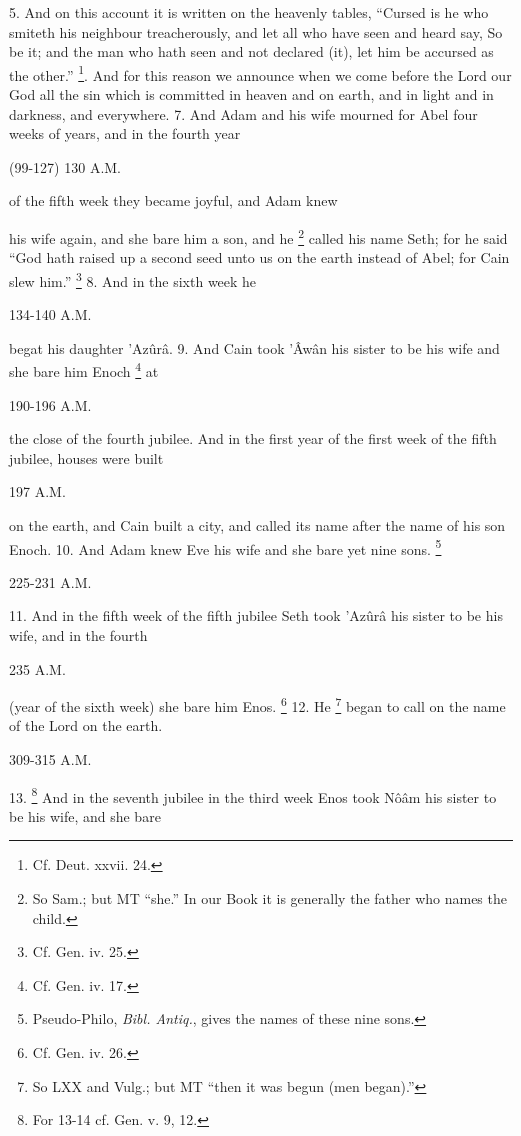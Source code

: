 5. And on this account it is written on the heavenly tables, ``Cursed is he who smiteth his neighbour treacherously, and let all who have seen and heard say, So be it; and the man who hath seen and not declared (it), let him be accursed as the other.'' \footnote{Cf. Deut. xxvii. 24.}. And for this reason we announce when we come before the Lord our God all the sin which is committed in heaven and on earth, and in light and in darkness, and everywhere. 7. And Adam and his wife mourned for Abel four weeks of years, and in the fourth year

(99-127) 130 A.M.

of the fifth week they became joyful, and Adam knew

his wife again, and she bare him a son, and he \footnote{So Sam.; but MT ``she.'' In our Book it is generally the father who names the child.} called his name Seth; for he said ``God hath raised up a second seed unto us on the earth instead of Abel; for Cain slew him.'' \footnote{Cf. Gen. iv. 25.} 8. And in the sixth week he

134-140 A.M.

begat his daughter ’Azûrâ. 9. And Cain took ’Âwân his sister to be his wife and she bare him Enoch \footnote{Cf. Gen. iv. 17.} at

190-196 A.M.

the close of the fourth jubilee. And in the first year of the first week of the fifth jubilee, houses were built

197 A.M.

on the earth, and Cain built a city, and called its name after the name of his son Enoch. 10. And Adam knew Eve his wife and she bare yet nine sons. \footnote{Pseudo-Philo, \emph{Bibl. Antiq.}, gives the names of these nine sons.}

225-231 A.M.

11. And in the fifth week of the fifth jubilee Seth took ’Azûrâ his sister to be his wife, and in the fourth

235 A.M.

(year of the sixth week) she bare him Enos. \footnote{Cf. Gen. iv. 26.} 12. He \footnote{So LXX and Vulg.; but MT ``then it was begun (men began).''} began to call on the name of the Lord on the earth.


309-315 A.M.

13. \footnote{For 13-14 cf. Gen. v. 9, 12.} And in the seventh jubilee in the third week Enos took Nôâm his sister to be his wife, and she bare

